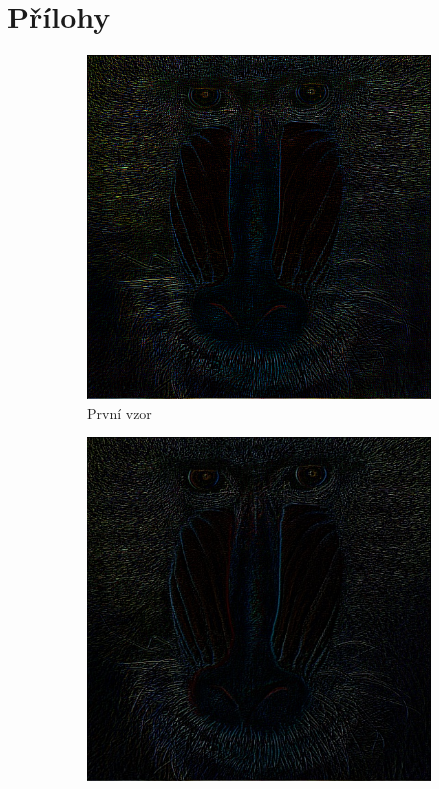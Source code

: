\documentclass[a4paper,11pt]{scrartcl}
\begin{document}
\section{Přílohy}

\begin{figure}[!h]
    \centering
    \caption{Porovnání výsledků}
    \label{porovnani}
    \begin{subfigure}[b]{0.4\textwidth}
        \includegraphics[width=\textwidth]{img/example1_E.png}
        \caption{První vzor}
        \label{fig:gull}
    \end{subfigure}
    \begin{subfigure}[b]{0.4\textwidth}
        \includegraphics[width=\textwidth]{img/ranksel-simple-ssim-dynamic_example1.jpg}

\end{subfigure}
\end{figure}
\end{document}
